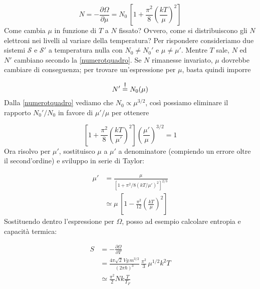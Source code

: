\documentclass[a4paper]{report}
\newcommand\ddfrac[2]{\frac{\displaystyle #1}{\displaystyle #2}}
\newcommand\impongo{\mathrel{\overset{\makebox[0pt]{\mbox{\normalfont\sffamily !}}}{=}}}
\begin{document}
\begin{equation}
    N = -\frac{\partial \Omega}{\partial \mu} = N_0 \, \left[1+\frac{\pi^2}{8}\left(\frac{k T}{\mu}\right)^2\right]
    \label{numerotquadro}
\end{equation}
Come cambia $\mu$ in funzione di $T$ a $N$ fissato? Ovvero, come si distribuiscono gli $N$ elettroni nei livelli al variare della temperatura? Per rispondere consideriamo due sistemi $\mathcal{S}$ e $\mathcal{S}'$ a temperatura nulla con $N_0 \neq N_0'$ e $\mu\neq\mu'$. Mentre $T$ sale, $N$ ed $N'$ cambiano secondo la \eqref{numerotquadro}. Se $N$ rimanesse invariato, $\mu$ dovrebbe cambiare di conseguenza; per trovare un'espressione per $\mu$, basta quindi imporre

\begin{equation}
    N' \impongo N_0(\mu)
\end{equation}
Dalla \eqref{numerotquadro} vediamo che $N_0\propto \mu^{3/2}$, così possiamo eliminare il rapporto $N_0'/N_0$ in favore di $\mu'/\mu$ per ottenere

\begin{equation}
    \left[1+\frac{\pi^2}{8}\left(\frac{k T}{\mu'}\right)^2\right]\left(\frac{\mu'}{\mu}\right)^{3/2} = 1
\end{equation}
Ora risolvo per $\mu'$, sostituisco $\mu$ a $\mu'$ a denominatore (compiendo un errore oltre il second'ordine) e sviluppo in serie di Taylor:

\begin{equation}
\begin{split}
    \mu'& = \ddfrac{\mu}{\left[1+\pi^2/8\left(k T / \mu'\right)^2\right]^{2/3}} \\
    & \simeq \mu \,\left[1-\frac{\pi^2}{12}\left(\frac{k T}{\mu}\right)^2\right]
\end{split}
\end{equation}
Sostituendo dentro l'espressione per $\Omega$, posso ad esempio calcolare entropia e capacità termica:

\begin{equation}
    \begin{split}
        S & = -\frac{\partial \Omega}{\partial T} \\
        & = \frac{4\pi\sqrt{2}\, V g\, m^{3/2}}{(2\pi\hbar)^3}\, \frac{\pi^2}{3}\,\mu^{1/2} k^2 T \\
        & \simeq \frac{\pi^2}{2} N k \frac{T}{T_F}
    \end{split}
\end{equation}
\end{document}
